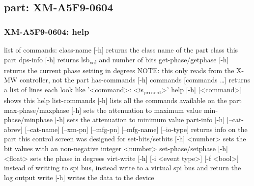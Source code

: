 \documentclass[11pt]{article}
\begin{document}
\subsection{part: XM-A5F9-0604}
\label{sec:org546fefd}
\subsubsection{XM-A5F9-0604: help}
\label{sec:orgaf91fdc}
list of commands:
  class-name [-h]
    returns the class name of the part class this part
  dps-info [-h]
    returns lsb\textsubscript{val} and number of bits
  get-phase/getphase [-h]
    returns the current phase setting in degrees
    NOTE: this only reads from the X-MW controller, not the part
  has-commands [-h] commands [commands \ldots{}]
    returns a list of lines each look like '<command>: <is\textsubscript{present}>'
  help [-h] [<command>]
    shows this help
  list-commands [-h]
    lists all the commands available on the part
  max-phase/maxphase [-h]
    sets the attenuation to maximum value
  min-phase/minphase [-h]
    sets the attenuation to minimum value
  part-info  [-h] [--cat-abrev] [--cat-name] [--xm-pn] [--mfg-pn] [--mfg-name]
          [--io-type]
    returns info on the part this control screen was designed for
  set-bits/setbits [-h] <number>
    sets the bit values with an non-negative integer <number>
  set-phase/setphase [-h] <float>
    sets the phase in degrees
  virt-write [-h] [-i <event type>] [-f <bool>]
    instead of writting to spi bus, instead write to a virtual spi bus
    and return the log output
  write [-h]
    writes the data to the device
\end{document}
